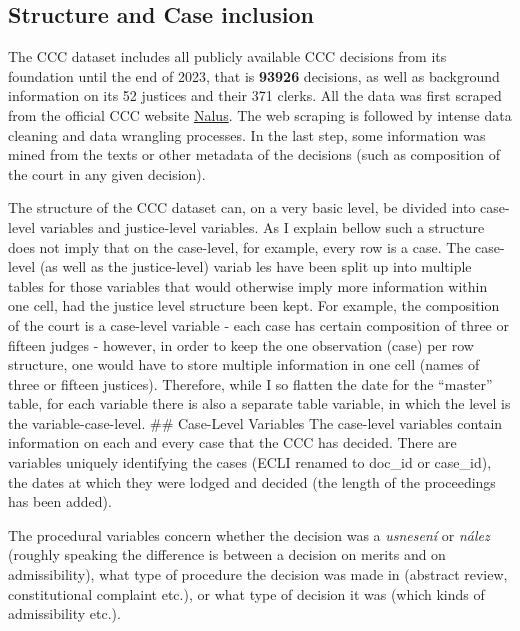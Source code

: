 \documentclass[
  11pt,
]{article}
\begin{document}
\hypertarget{structure-and-case-inclusion}{%
\subsection{Structure and Case
inclusion}\label{structure-and-case-inclusion}}

The CCC dataset includes all publicly available CCC decisions from its
foundation until the end of 2023, that is \textbf{93926} decisions, as
well as background information on its 52 justices and their 371 clerks.
All the data was first scraped from the official CCC website
\href{https://nalus.usoud.cz/Search/Search.aspx}{Nalus}. The web
scraping is followed by intense data cleaning and data wrangling
processes. In the last step, some information was mined from the texts
or other metadata of the decisions (such as composition of the court in
any given decision).

The structure of the CCC dataset can, on a very basic level, be divided
into case-level variables and justice-level variables. As I explain
bellow such a structure does not imply that on the case-level, for
example, every row is a case. The case-level (as well as the
justice-level) variab les have been split up into multiple tables for
those variables that would otherwise imply more information within one
cell, had the justice level structure been kept. For example, the
composition of the court is a case-level variable - each case has
certain composition of three or fifteen judges - however, in order to
keep the one observation (case) per row structure, one would have to
store multiple information in one cell (names of three or fifteen
justices). Therefore, while I so flatten the date for the ``master''
table, for each variable there is also a separate table variable, in
which the level is the variable-case-level. \#\# Case-Level Variables
The case-level variables contain information on each and every case that
the CCC has decided. There are variables uniquely identifying the cases
(ECLI renamed to doc\_id or case\_id), the dates at which they were
lodged and decided (the length of the proceedings has been added).

The procedural variables concern whether the decision was a
\emph{usnesení} or \emph{nález} (roughly speaking the difference is
between a decision on merits and on admissibility), what type of
procedure the decision was made in (abstract review, constitutional
complaint etc.), or what type of decision it was (which kinds of
admissibility etc.).
\end{document}
